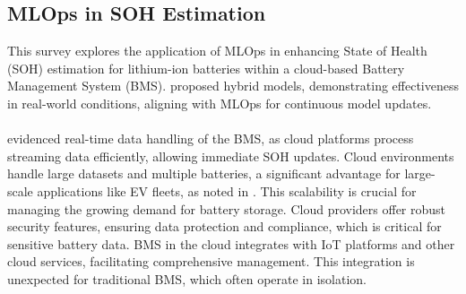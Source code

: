 \subsection{MLOps in SOH Estimation}
This survey explores the application of MLOps in enhancing State of Health (SOH) estimation for lithium-ion batteries within a cloud-based Battery Management System (BMS). \cite{en15051692} proposed hybrid models, demonstrating effectiveness in real-world conditions, aligning with MLOps for continuous model updates.\\ \\ \cite{8095896} evidenced real-time data handling of the BMS, as cloud platforms process streaming data efficiently, allowing immediate SOH updates. Cloud environments handle large datasets and multiple batteries, a significant advantage for large-scale applications like EV fleets, as noted in \cite{batteries8020019}. This scalability is crucial for managing the growing demand for battery storage. Cloud providers offer robust security features, ensuring data protection and compliance, which is critical for sensitive battery data. BMS in the cloud integrates with IoT platforms and other cloud services, facilitating comprehensive management. This integration is unexpected for traditional BMS, which often operate in isolation.